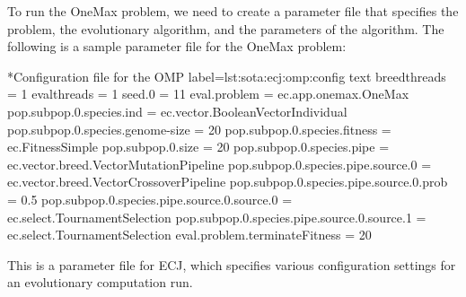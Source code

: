   To run the OneMax problem, we need to create a parameter file that specifies 
  the problem, the evolutionary algorithm, and the parameters of the algorithm.
  The following is a sample parameter file for the OneMax problem:

  \begin{code}*{Configuration file for the OMP}{
    label=lst:sota:ecj:omp:config
  }{text}
    breedthreads = 1
    evalthreads = 1
    seed.0 = 11
    eval.problem = ec.app.onemax.OneMax
    pop.subpop.0.species.ind = ec.vector.BooleanVectorIndividual
    pop.subpop.0.species.genome-size = 20
    pop.subpop.0.species.fitness = ec.FitnessSimple
    pop.subpop.0.size = 20
    pop.subpop.0.species.pipe = ec.vector.breed.VectorMutationPipeline
    pop.subpop.0.species.pipe.source.0 = ec.vector.breed.VectorCrossoverPipeline
    pop.subpop.0.species.pipe.source.0.prob = 0.5
    pop.subpop.0.species.pipe.source.0.source.0 = ec.select.TournamentSelection
    pop.subpop.0.species.pipe.source.0.source.1 = ec.select.TournamentSelection
    eval.problem.terminateFitness = 20
  \end{code}

  This is a parameter file for ECJ, which specifies various configuration 
  settings for an evolutionary computation run.
  

